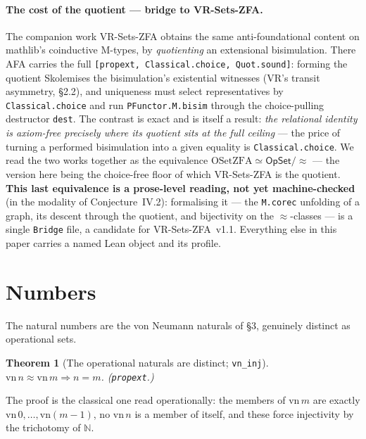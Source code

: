 \documentclass[11pt]{article}
\newtheorem{thm}{Theorem}[section]
\theoremstyle{remark}
\newcommand{\OpSet}{\textsf{OpSet}}
\newcommand{\eq}{\approx}
\newcommand{\N}{\mathbb{N}}
\begin{document}
\paragraph{The cost of the quotient --- bridge to VR-Sets-ZFA.} The companion work VR-Sets-ZFA
obtains the same anti-foundational content on mathlib's coinductive M-types, by \emph{quotienting} an
extensional bisimulation. There AFA carries the full \texttt{[propext, Classical.choice, Quot.sound]}:
forming the quotient Skolemises the bisimulation's existential witnesses (VR's transit asymmetry,
\S2.2), and uniqueness must select representatives by \texttt{Classical.choice} and run
\texttt{PFunctor.M.bisim} through the choice-pulling destructor \texttt{dest}. The contrast is exact
and is itself a result: \emph{the relational identity is axiom-free precisely where its quotient sits
at the full ceiling} --- the price of turning a performed bisimulation into a given equality is
\texttt{Classical.choice}. We read the two works together as the equivalence
$\mathrm{OSetZFA}\simeq\OpSet/\!\eq$ --- the version here being the choice-free floor of which
VR-Sets-ZFA is the quotient. \textbf{This last equivalence is a prose-level reading, not yet
machine-checked} (in the modality of Conjecture~IV.2): formalising it --- the \texttt{M.corec}
unfolding of a graph, its descent through the quotient, and bijectivity on the $\eq$-classes --- is a
single \texttt{Bridge} file, a candidate for VR-Sets-ZFA~v1.1. Everything else in this paper carries a
named Lean object and its profile.

\section{Numbers}
The natural numbers are the von Neumann naturals of \S3, genuinely distinct as operational sets.
\begin{thm}[The operational naturals are distinct; \texttt{vn\_inj}]
$\mathrm{vn}\,n\eq\mathrm{vn}\,m\Rightarrow n=m$. (\texttt{propext}.)
\end{thm}
The proof is the classical one read operationally: the members of $\mathrm{vn}\,m$ are exactly
$\mathrm{vn}\,0,\dots,\mathrm{vn}(m{-}1)$, no $\mathrm{vn}\,n$ is a member of itself, and these force
injectivity by the trichotomy of $\N$.
\end{document}
